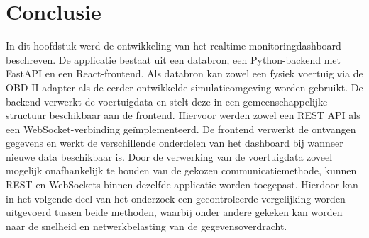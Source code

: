 \section{Conclusie}
In dit hoofdstuk werd de ontwikkeling van het realtime monitoringdashboard beschreven. De applicatie bestaat uit een databron, een Python-backend met FastAPI en een React-frontend. Als databron kan zowel een fysiek voertuig via de OBD-II-adapter als de eerder ontwikkelde simulatieomgeving worden gebruikt.
De backend verwerkt de voertuigdata en stelt deze in een gemeenschappelijke structuur beschikbaar aan de frontend. Hiervoor werden zowel een REST API als een WebSocket-verbinding geïmplementeerd. De frontend verwerkt de ontvangen gegevens en werkt de verschillende onderdelen van het dashboard bij wanneer nieuwe data beschikbaar is.
Door de verwerking van de voertuigdata zoveel mogelijk onafhankelijk te houden van de gekozen communicatiemethode, kunnen REST en WebSockets binnen dezelfde applicatie worden toegepast. Hierdoor kan in het volgende deel van het onderzoek een gecontroleerde vergelijking worden uitgevoerd tussen beide methoden, waarbij onder andere gekeken kan worden naar de snelheid en netwerkbelasting van de gegevensoverdracht.